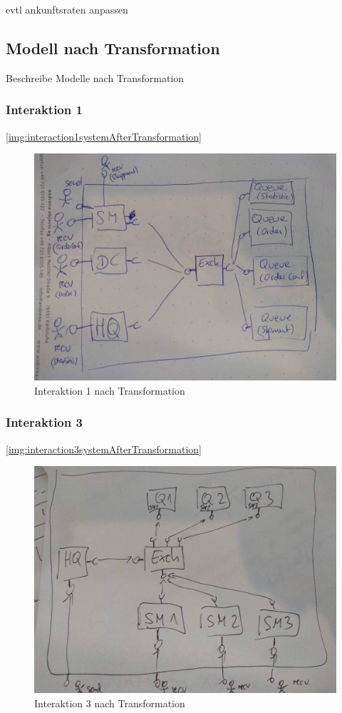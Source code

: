 evtl ankunftsraten anpassen

\subsection{Modell nach Transformation}
Beschreibe Modelle nach Transformation \\
\subsubsection{Interaktion 1}
\autoref{img:interaction1systemAfterTransformation}
\begin{figure}
\center
  \includegraphics[width=1\textwidth]{images/evaluation/specjms/interaction1system.png}
  \caption{Interaktion 1 nach Transformation}
  \label{img:interaction1systemAfterTransformation}
\end{figure}
\subsubsection{Interaktion 3}
\autoref{img:interaction3systemAfterTransformation}
\begin{figure}
\center
  \includegraphics[width=1\textwidth]{images/evaluation/specjms/interaction3system.png}
  \caption{Interaktion 3 nach Transformation}
  \label{img:interaction3systemAfterTransformation}
\end{figure}
